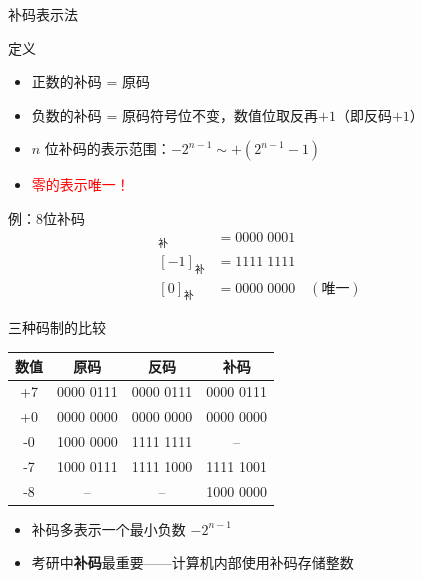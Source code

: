 \documentclass[10pt, aspectratio=169]{beamer}
\begin{document}
\begin{frame}{补码表示法}
    \begin{block}{定义}
        \begin{itemize}
            \item 正数的补码 = 原码
            \item 负数的补码 = 原码符号位不变，数值位取反再$+1$（即反码$+1$）
            \item $n$ 位补码的表示范围：$-2^{n-1} \sim +(2^{n-1} - 1)$
            \item \textcolor{red}{零的表示唯一！}
        \end{itemize}
    \end{block}
    \vspace{0.3em}
    \begin{exampleblock}{例：8位补码}
        \begin{align*}
            [+1]_{\text{补}} &= 0000\;0001 \\
            [-1]_{\text{补}} &= 1111\;1111 \\
            [0]_{\text{补}}   &= 0000\;0000 \quad (\text{唯一})
        \end{align*}
    \end{exampleblock}
\end{frame}

\begin{frame}{三种码制的比较}
    \begin{center}
        \begin{tabular}{|c|c|c|c|}
            \hline
            \textbf{数值} & \textbf{原码} & \textbf{反码} & \textbf{补码} \\
            \hline
            +7 & 0000 0111 & 0000 0111 & 0000 0111 \\
            \hline
            +0 & 0000 0000 & 0000 0000 & 0000 0000 \\
            \hline
            -0 & 1000 0000 & 1111 1111 & -- \\
            \hline
            -7 & 1000 0111 & 1111 1000 & 1111 1001 \\
            \hline
            -8 & -- & -- & 1000 0000 \\
            \hline
        \end{tabular}
    \end{center}
    \vspace{0.5em}
    \begin{itemize}
        \item 补码多表示一个最小负数 $-2^{n-1}$
        \item 考研中\textbf{补码}最重要——计算机内部使用补码存储整数
    \end{itemize}
\end{frame}
\end{document}
